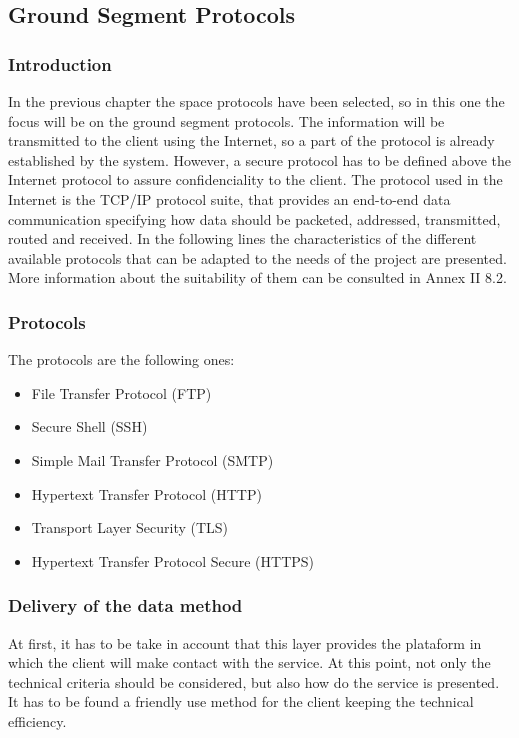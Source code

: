 \subsection{Ground Segment Protocols}
\subsubsection{Introduction}
In the previous chapter the space protocols have been selected, so in this one the focus will be on the ground segment protocols. The information will be transmitted to the client using the Internet, so a part of the protocol is already established by the system. However, a secure protocol has to be defined above the Internet protocol to assure confidenciality to the client. The protocol used in the Internet is the TCP/IP protocol suite, that provides an end-to-end data communication specifying how data should be packeted, addressed, transmitted, routed and received.
In the following lines the characteristics of the different available protocols that can be adapted to the needs of the project are presented. More information about the suitability of them can be consulted in Annex II 8.2.
\subsubsection{Protocols}
The protocols are the following ones:
\begin{itemize}
\item File Transfer Protocol (FTP)
\item Secure Shell (SSH)
\item Simple Mail Transfer Protocol (SMTP)
\item Hypertext Transfer Protocol (HTTP)
\item Transport Layer Security (TLS)
\item Hypertext Transfer Protocol Secure (HTTPS)
\end{itemize} 
\subsubsection{Delivery of the data method} 
At first, it has to be take in account that this layer provides the plataform in which the client will make contact with the service. At this point, not only the technical criteria should be considered, but also how do the service is presented. It has to be found a friendly use method for the client keeping the technical efficiency.


